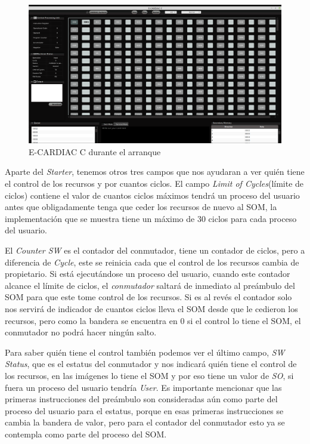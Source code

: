 \documentclass[letterpaper,12pt,oneside]{book}
\begin{document}
		\begin{figure}[h]		
			\centering
			\includegraphics[scale=0.25]{media/CARDIACC/ECARDIACC_encendida1.png}
			\caption{E-CARDIAC C durante el arranque}
			\label{fig:eccEncendida1}
		\end{figure}
	
		Aparte del \textit{Starter}, tenemos otros tres campos que nos ayudaran a ver quién tiene el control de los recursos y por cuantos ciclos. El campo
		\textit{Limit of Cycles}(límite de ciclos) contiene el valor de cuantos ciclos máximos tendrá un proceso del usuario antes que obligadamente tenga que ceder
		los recursos de nuevo al SOM, la implementación que se muestra tiene un máximo de 30 ciclos para cada proceso del usuario.
  
        El \textit{Counter SW} es el contador del conmutador, tiene
		un contador de ciclos, pero a diferencia de \textit{Cycle}, este se reinicia cada que el control de los recursos cambia de propietario. Si está
		ejecutándose un proceso del usuario, cuando este contador alcance el límite de ciclos, el \textit{conmutador} saltará
		de inmediato al preámbulo del SOM para que este tome control de los recursos. Si es al revés el contador solo nos servirá de indicador
		de cuantos ciclos lleva el SOM desde que le cedieron los recursos, pero como la bandera se encuentra en 0 si el control lo tiene el SOM, el conmutador
		no podrá hacer ningún salto.
  
        Para saber quién tiene el control también podemos ver el último campo, \textit{SW Status}, que es el estatus del conmutador y nos indicará quién tiene
		el control de los recursos, en las imágenes lo tiene el SOM y por eso tiene un valor de \textit{SO}, si fuera un proceso del usuario tendría \textit{User}. Es
		importante mencionar que las primeras instrucciones del preámbulo son consideradas aún como parte del proceso del usuario para el estatus, porque
		en esas primeras instrucciones se cambia la bandera de valor, pero para el contador del conmutador esto ya se contempla como parte del
		proceso del SOM.
		
\end{document}
